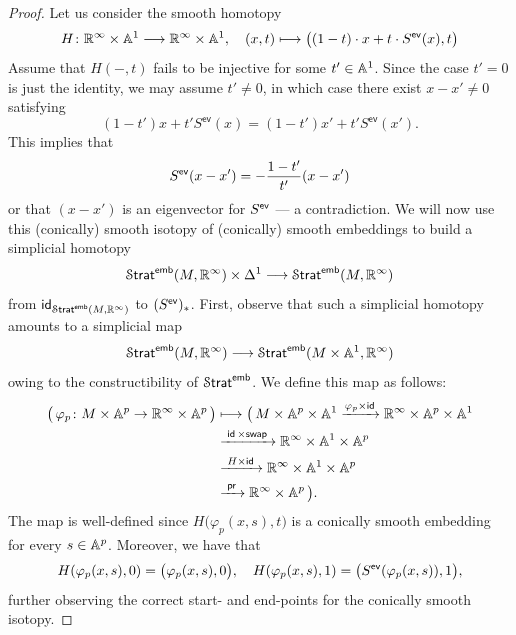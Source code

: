 \begin{proof}
Let us consider the smooth homotopy 
\begin{equation}
    H \maps \RR^{\oo} \times \AA^1 \longra \RR^{\oo}\times \AA^1, \quad (x,t) \longmapsto \big((1-t)\cdot x + t \cdot S^{\mathsf{ev}}(x), t \big)
\end{equation}
Assume that $H(-,t)$ fails to be injective for some $t'\in \AA^1$. Since the case $t'=0$ is just the identity, we may assume $t'\neq 0$, in which case there exist $x-x' \neq 0$ satisfying 
\begin{equation}
    (1-t')x + t' S^{\mathsf{ev}}(x) = (1-t')x' + t' S^{\mathsf{ev}}(x').
\end{equation}
This implies that 
\begin{equation}
S^{\sf ev}(x-x') = -\frac{1-t'}{t'}(x-x')
\end{equation}
or that $(x-x')$ is an eigenvector for $S^{\sf ev}$ — a contradiction.
\smallskip
\noindent We will now use this (conically) smooth isotopy of (conically) smooth embeddings to build a simplicial homotopy  
\begin{equation}
    \Strat^{\sf emb}(M, \RR^{\oo})\times \Delta^{1} \longra \Strat^{\sf emb}(M, \RR^{\oo})
\end{equation}
from $\id_{\Strat^{\sf emb}(M,\RR^{\oo})}$ to $(S^{\sf ev})_{*}$. First, observe that such a simplicial homotopy amounts to a simplicial map 
\begin{equation}
    \Strat^{\sf emb}(M, \RR^{\oo}) \longra \Strat^{\sf emb}(M \times \AA^1, \RR^{\oo})
\end{equation}   
owing to the constructibility of $\Strat^{\sf emb}$. We define this map as follows:
\begin{align}    
    \big(\, \varphi_p \maps M \times \AA^p \ra \RR^{\oo} \times \AA^p \,\big) &\longmapsto 
    \big(\, M \times \AA^p \times \AA^{1} \xra{\varphi_p \times \id} \RR^{\oo} \times \AA^p \times \AA^1  \\
    &\xra{\,\,\id \times \mathsf{swap}\,\,} \RR^{\oo} \times \AA^1 \times \AA^p \\
    &\xra{\,\, H \times \id \,\,} \RR^{\oo} \times \AA^{1} \times \AA^p \\ 
    &\xra{\,\, \sf pr \,\,} \RR^{\oo} \times \AA^p \, \big).
\end{align}
The map is well-defined since $H\big(\varphi_p(x,s),t\big)$ is a conically smooth embedding for every $s \in \AA^p$. Moreover, we have that 
\begin{equation}
    H(\varphi_p(x,s),0) = \big(\varphi_{p}(x,s),0\big), \quad H(\varphi_{p}(x,s),1) = \big(S^{\sf ev}(\varphi_{p}(x,s)),1\big),
\end{equation}
further observing the correct start- and end-points for the conically smooth isotopy.


\end{proof}

